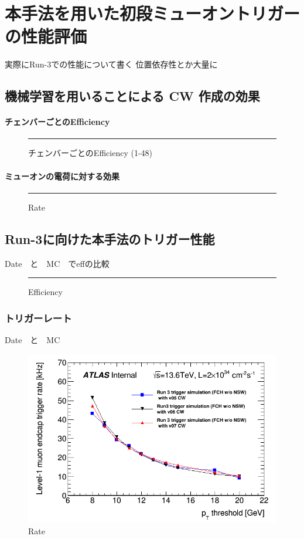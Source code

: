 \chapter{本手法を用いた初段ミューオントリガーの性能評価}
実際にRun-3での性能について書く
位置依存性とか大量に

\section{機械学習を用いることによる CW 作成の効果}
\subsubsection{チェンバーごとのEfficiency}
\begin{figure}[tb]
  \centering
  \rule{8cm}{6cm}
  \caption{チェンバーごとのEfficiency (1-48)}
  \label{fig:fit_def}
\end{figure}

\subsubsection{ミューオンの電荷に対する効果}

\begin{figure}[tb]
  \centering
  \rule{8cm}{6cm}
  \caption{Rate}
  \label{fig:fit_def}
\end{figure}


\section{Run-3に向けた本手法のトリガー性能}
Date　と　MC　でeffの比較
\begin{figure}[tb]
  \centering
  \rule{8cm}{6cm}
  \caption{Efficiency}
  \label{fig:fit_def}
\end{figure}

\subsection{トリガーレート}
Date　と　MC
\begin{figure}[tb]
  \centering
  \includegraphics[clip, width=14cm]{fig/5/l1mue_rate_run3.png}
  \caption{Rate}
  \label{fig:fit_def}
\end{figure}

